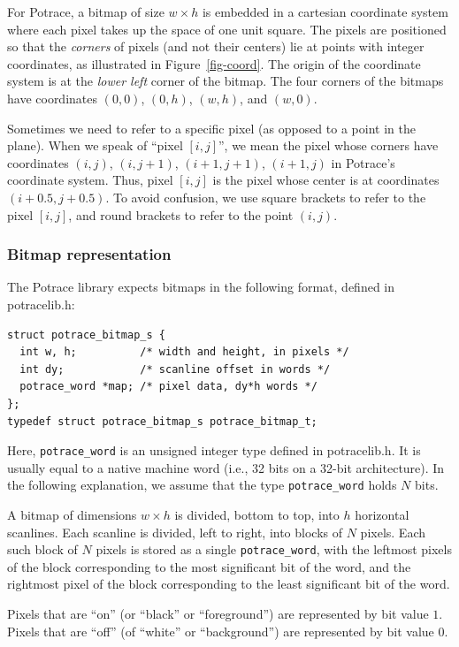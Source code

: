 \documentclass{article}
\begin{document}
For Potrace, a bitmap of size $w\times h$ is embedded in a cartesian
coordinate system where each pixel takes up the space of one unit
square. The pixels are positioned so that the {\em corners} of pixels
(and not their centers) lie at points with integer coordinates, as
illustrated in Figure~\ref{fig-coord}. The origin of the coordinate
system is at the {\em lower left} corner of the bitmap. The four
corners of the bitmaps have coordinates $(0,0)$, $(0,h)$, $(w,h)$, and
$(w,0)$.

Sometimes we need to refer to a specific pixel (as opposed to a point
in the plane). When we speak of ``pixel $[i,j]$'', we mean the pixel
whose corners have coordinates $(i,j)$, $(i,j+1)$, $(i+1,j+1)$,
$(i+1,j)$ in Potrace's coordinate system. Thus, pixel $[i,j]$ is the
pixel whose center is at coordinates $(i+0.5, j+0.5)$. To avoid
confusion, we use square brackets to refer to the pixel $[i,j]$, and
round brackets to refer to the point $(i,j)$.

\subsubsection{Bitmap representation}

The Potrace library expects bitmaps in the following format, defined
in potracelib.h:

\begin{verbatim}
struct potrace_bitmap_s {
  int w, h;          /* width and height, in pixels */
  int dy;            /* scanline offset in words */
  potrace_word *map; /* pixel data, dy*h words */
};
typedef struct potrace_bitmap_s potrace_bitmap_t;
\end{verbatim}

Here, \verb!potrace_word! is an unsigned integer type defined in
potracelib.h. It is usually equal to a native machine word (i.e., 32
bits on a 32-bit architecture). In the following explanation, we
assume that the type \verb!potrace_word! holds $N$ bits.

A bitmap of dimensions $w\times h$ is divided, bottom to top, into $h$
horizontal scanlines. Each scanline is divided, left to right, into
blocks of $N$ pixels. Each such block of $N$ pixels is stored as a
single \verb!potrace_word!, with the leftmost pixels of the block
corresponding to the most significant bit of the word, and the
rightmost pixel of the block corresponding to the least significant
bit of the word.

Pixels that are ``on'' (or ``black'' or ``foreground'') are
represented by bit value $1$.  Pixels that are ``off'' (of ``white''
or ``background'') are represented by bit value $0$.
\end{document}
